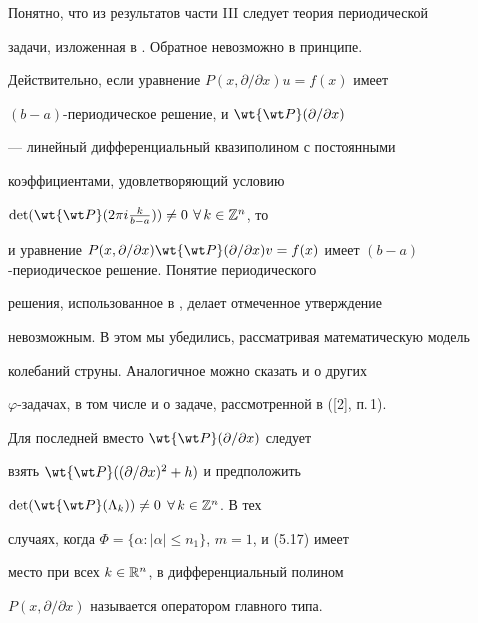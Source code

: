 \begin{notes} 


Понятно, что из результатов части III следует теория периодической 


задачи, изложенная в \cite{4}. Обратное невозможно в принципе. 


Действительно, если уравнение $P(x,\partial/\partial x)u=f(x)$ имеет 


$(b{-}a)$-периодическое решение, и $\wt{\wt P}(\partial/\partial x)$ 


--- линейный дифференциальный квазиполином с постоянными 


коэффициентами, удовлетворяющий условию \linebreak


$\det(\wt{\wt P}(2\pi i\frac{k}{b-a}))\ne0$ $\forall\,k\in\Bbb Z^n$, то 


и уравнение $P(x,\partial/\partial x)\wt{\wt P}(\partial/\partial 


x)v=f(x)$ имеет $(b{-}a)$-перио\-ди\-чес\-кое решение. Понятие периодического 


решения, использованное в \cite{4}, делает отмеченное утверждение 


невозможным. В этом мы убедились, рассматривая математическую модель 


колебаний струны. Аналогичное можно сказать и о других 


$\varphi$-задачах, в том числе и о задаче, рассмотренной в ([2], п.\,1).


Для последней вместо $\wt{\wt P}(\partial/\partial x)$ следует 


взять $\wt{\wt P}((\partial/\partial x)^2+h)$ и предположить 


$\det(\wt{\wt P}(\Lambda_k))\ne0$ $\forall\,k\in\Bbb Z^n$. В тех 


случаях, когда $\Phi=\{\alpha:|\alpha|\le n_1\}$, $m=1$, и (5.17) имеет 


место при всех $k\in\Bbb R^n$, в \cite{5} дифференциальный полином 


$P(x,\partial/\partial x)$ называется оператором главного типа. 


\end{notes} 


 


 


